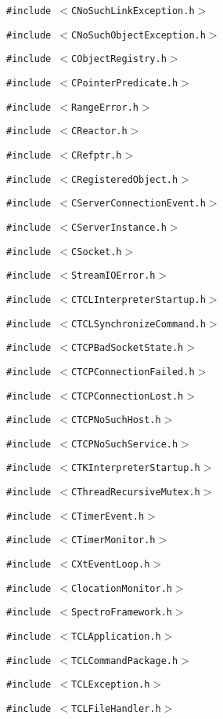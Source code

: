 {\tt \#include $<$CNo\-Such\-Link\-Exception.h$>$}\par
{\tt \#include $<$CNo\-Such\-Object\-Exception.h$>$}\par
{\tt \#include $<$CObject\-Registry.h$>$}\par
{\tt \#include $<$CPointer\-Predicate.h$>$}\par
{\tt \#include $<$Range\-Error.h$>$}\par
{\tt \#include $<$CReactor.h$>$}\par
{\tt \#include $<$CRefptr.h$>$}\par
{\tt \#include $<$CRegistered\-Object.h$>$}\par
{\tt \#include $<$CServer\-Connection\-Event.h$>$}\par
{\tt \#include $<$CServer\-Instance.h$>$}\par
{\tt \#include $<$CSocket.h$>$}\par
{\tt \#include $<$Stream\-IOError.h$>$}\par
{\tt \#include $<$CTCLInterpreter\-Startup.h$>$}\par
{\tt \#include $<$CTCLSynchronize\-Command.h$>$}\par
{\tt \#include $<$CTCPBad\-Socket\-State.h$>$}\par
{\tt \#include $<$CTCPConnection\-Failed.h$>$}\par
{\tt \#include $<$CTCPConnection\-Lost.h$>$}\par
{\tt \#include $<$CTCPNo\-Such\-Host.h$>$}\par
{\tt \#include $<$CTCPNo\-Such\-Service.h$>$}\par
{\tt \#include $<$CTKInterpreter\-Startup.h$>$}\par
{\tt \#include $<$CThread\-Recursive\-Mutex.h$>$}\par
{\tt \#include $<$CTimer\-Event.h$>$}\par
{\tt \#include $<$CTimer\-Monitor.h$>$}\par
{\tt \#include $<$CXt\-Event\-Loop.h$>$}\par
{\tt \#include $<$Clocation\-Monitor.h$>$}\par
{\tt \#include $<$Spectro\-Framework.h$>$}\par
{\tt \#include $<$TCLApplication.h$>$}\par
{\tt \#include $<$TCLCommand\-Package.h$>$}\par
{\tt \#include $<$TCLException.h$>$}\par
{\tt \#include $<$TCLFile\-Handler.h$>$}\par
